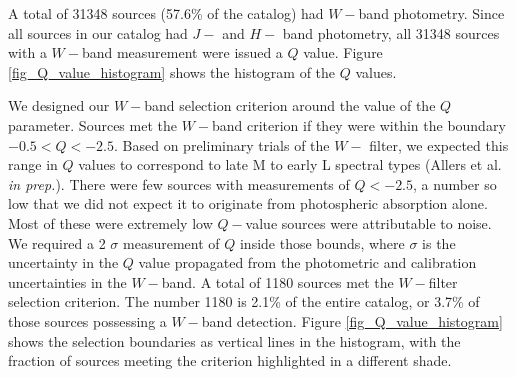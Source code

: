 A total of 31348 sources (57.6\% of the catalog) had $W-$band photometry.  Since all sources in our catalog had $J-$ and $H-$ band photometry, all 31348 sources with a $W-$band measurement were issued a $Q$ value.  Figure \ref{fig_Q_value_histogram} shows the histogram of the $Q$ values.

We designed our $W-$band selection criterion around the value of the $Q$ parameter. Sources met the $W-$band criterion if they were within the boundary $-0.5<Q<-2.5$.  Based on preliminary trials of the $W-$ filter, we expected this range in $Q$ values to correspond to late M to early L spectral types (Allers et al. \emph{in prep.}).  There were few sources with measurements of $Q<-2.5$, a number so low that we did not expect it to originate from photospheric absorption alone.  Most of these were extremely low $Q-$value sources were attributable to noise.  We required a 2 $\sigma$ measurement of $Q$ inside those bounds, where $\sigma$ is the uncertainty in the $Q$ value propagated from the photometric and calibration uncertainties in the $W-$band.  A total of 1180 sources met the $W-$filter selection criterion.  The number 1180 is 2.1\% of the entire catalog, or 3.7\% of those sources possessing a $W-$band detection.  Figure \ref{fig_Q_value_histogram} shows the selection boundaries as vertical lines in the histogram, with the fraction of sources meeting the criterion highlighted in a different shade.  

